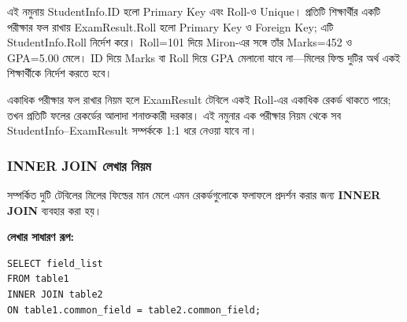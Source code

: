 \par\smallskip
এই নমুনায় StudentInfo.ID হলো Primary Key এবং Roll-ও Unique। প্রতিটি
শিক্ষার্থীর একটি পরীক্ষার ফল রাখায় ExamResult.Roll হলো Primary Key ও
Foreign Key; এটি StudentInfo.Roll নির্দেশ করে। Roll=101 দিয়ে Miron-এর
সঙ্গে তাঁর Marks=452 ও GPA=5.00 মেলে। ID দিয়ে Marks বা Roll দিয়ে GPA
মেলানো যাবে না—মিলের ফিল্ড দুটির অর্থ একই শিক্ষার্থীকে নির্দেশ করতে হবে।

একাধিক পরীক্ষার ফল রাখার নিয়ম হলে ExamResult টেবিলে একই Roll-এর একাধিক রেকর্ড থাকতে পারে;
তখন প্রতিটি ফলের রেকর্ডের আলাদা শনাক্তকারী দরকার। এই নমুনার এক পরীক্ষার নিয়ম থেকে
সব StudentInfo--ExamResult সম্পর্ককে 1:1 ধরে নেওয়া যাবে না।

\subsubsection{INNER JOIN লেখার নিয়ম}

\begin{definitionbox}{}

সম্পর্কিত দুটি টেবিলের মিলের ফিল্ডের মান মেলে
এমন রেকর্ডগুলোকে ফলাফলে প্রদর্শন করার জন্য
\textbf{INNER JOIN} ব্যবহার করা হয়।

\end{definitionbox}

\textbf{লেখার সাধারণ রূপ:}

\par\noindent\begin{minipage}{\linewidth}
\begin{verbatim}
SELECT field_list
FROM table1
INNER JOIN table2
ON table1.common_field = table2.common_field;
\end{verbatim}
\end{minipage}\par

